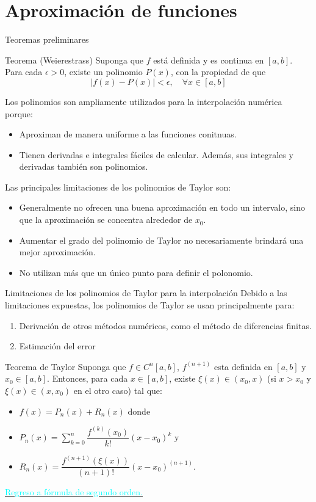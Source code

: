 \section{Aproximación de funciones}
\begin{frame}{Teoremas preliminares}
\begin{block}{Teorema (Weierestrass)}
Suponga que $f$ está definida y es continua en $[a, b]$. Para cada $\epsilon>0$, existe un polinomio $P(x)$, con la propiedad de que 
$$|f(x)-P(x)|<\epsilon, \quad \forall x \in [a, b]$$
\end{block}
\indent Los polinomios son ampliamente utilizados para la interpolación numérica porque:
\begin{itemize}
\item Aproximan de manera uniforme a las funciones conitnuas. 
\item Tienen derivadas e integrales fáciles de calcular. Además, sus integrales y derivadas también son polinomios. 
\end{itemize}
\indent Las principales limitaciones de los polinomios de Taylor son:
\begin{itemize}
\item Generalmente no ofrecen una buena aproximación en todo un intervalo, sino que la aproximación se concentra alrededor de $x_0$.
\item Aumentar el grado del polinomio de Taylor no necesariamente brindará una mejor aproximación.   
\item No utilizan más que un único punto para definir el polonomio.  
\end{itemize}
\end{frame}
\begin{frame}{Limitaciones de los polinomios de Taylor para la interpolación}
\indent Debido a las limitaciones expuestas, los polinomios de Taylor se usan principalmente para:
\begin{enumerate}
\item Derivación de otros métodos numéricos, como el método de diferencias finitas.
\item Estimación del error
\end{enumerate}
\label{TeoremaTaylor}
\begin{block}{Teorema de Taylor}
Suponga que $f\in C^n[a,b]$, $f^{(n+1)}$ esta definida en $[a,b]$ y $x_0\in[a,b]$. Entonces, para cada $x\in[a,b]$, existe $\xi(x)\in (x_0,x)$ (si $x>x_0$ y $\xi(x)\in(x,x_0)$ en el otro caso)  tal que: 
\begin{itemize}
\item $f(x)=P_n(x)+R_n(x)$ donde
\item $P_n(x)=\displaystyle \sum_{k=0}^{n}\dfrac{f^{(k)}(x_0)}{k!}(x-x_0)^k$ y
\item $R_n(x)=\dfrac{f^{(n+1)}(\xi(x))}{(n+1)!}(x-x_0)^{(n+1)}$.
\end{itemize}
\hyperlink{DeduccionFormulaSegundoOrden}{\textcolor{cyan}{Regreso a fórmula de segundo orden.}}
\end{block}
\end{frame}

